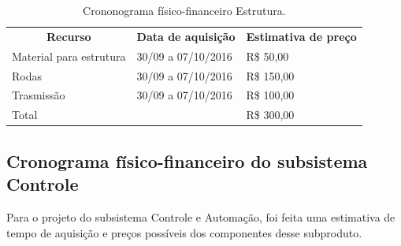 \begin{table}[h]
 \centering
 {\renewcommand\arraystretch{1.25}
 \caption{Crononograma físico-financeiro Estrutura.}
 \label{tab:custos_estrutura}
 \begin{tabular}{ l l l }
  \cline{1-1}\cline{2-2}\cline{3-3}  
    \multicolumn{1}{|c|}{\textbf{Recurso} \centering } &
    \multicolumn{1}{c|}{\textbf{Data de aquisição} \centering } &
    \multicolumn{1}{c|}{\textbf{Estimativa de preço} \centering }
  \\  
  \cline{1-1}\cline{2-2}\cline{3-3}  
    \multicolumn{1}{|p{3.850cm}|}{Material para estrutura \centering } &
    \multicolumn{1}{p{4.217cm}|}{30/09 a 07/10/2016 \centering } &
    \multicolumn{1}{p{4.217cm}|}{R\$ 50,00 \centering }
  \\  
  \cline{1-1}\cline{2-2}\cline{3-3}  
    \multicolumn{1}{|p{3.850cm}|}{Rodas \centering } &
    \multicolumn{1}{p{4.217cm}|}{30/09 a 07/10/2016 \centering } &
    \multicolumn{1}{p{4.217cm}|}{R\$ 150,00 \centering }
  \\  
  \cline{1-1}\cline{2-2}\cline{3-3}  
    \multicolumn{1}{|p{3.850cm}|}{Trasmissão \centering } &
    \multicolumn{1}{p{4.217cm}|}{30/09 a 07/10/2016 \centering } &
    \multicolumn{1}{p{4.217cm}|}{R\$ 100,00 \centering }
  \\  
  \cline{1-1}\cline{2-2}\cline{3-3}  
    \multicolumn{2}{|p{3.850cm}|}{Total \centering } &
    \multicolumn{1}{p{4.217cm}|}{R\$ 300,00 \centering }
  \\  
  \hline

 \end{tabular} }
\end{table}

\subsection{Cronograma físico-financeiro do subsistema Controle}
Para o projeto do subsistema Controle e Automação, foi feita uma estimativa de tempo de aquisição e preços possíveis dos componentes desse subproduto.

